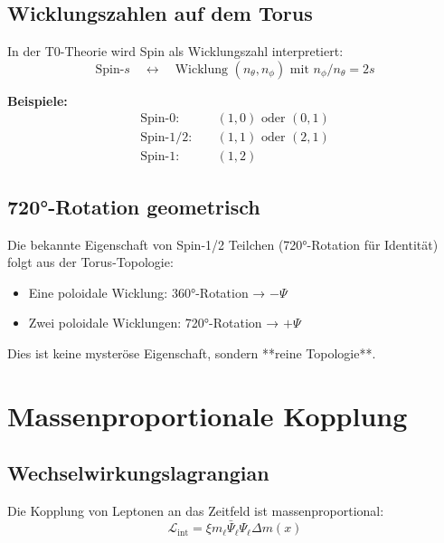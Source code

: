 	\subsection{Wicklungszahlen auf dem Torus}
	
	In der T0-Theorie wird Spin als Wicklungszahl interpretiert:
	\begin{equation}
		\text{Spin-}s \quad \longleftrightarrow \quad 
		\text{Wicklung } (n_\theta, n_\phi) \text{ mit } n_\phi/n_\theta = 2s
		\label{eq:spin_topology}
	\end{equation}
	
	\textbf{Beispiele:}
	\begin{align}
		\text{Spin-}0: &\quad (1, 0) \text{ oder } (0, 1) \\
		\text{Spin-}1/2: &\quad (1, 1) \text{ oder } (2, 1) \\
		\text{Spin-}1: &\quad (1, 2)
	\end{align}
	
	\subsection{720°-Rotation geometrisch}
	
	Die bekannte Eigenschaft von Spin-1/2 Teilchen (720°-Rotation für Identität) 
	folgt aus der Torus-Topologie:
	
	\begin{itemize}
		\item Eine poloidale Wicklung: 360°-Rotation → $-\Psi$
		\item Zwei poloidale Wicklungen: 720°-Rotation → $+\Psi$
	\end{itemize}
	
	Dies ist keine mysteröse Eigenschaft, sondern **reine Topologie**.
	
	\section{Massenproportionale Kopplung}
	
	\subsection{Wechselwirkungslagrangian}
	
	Die Kopplung von Leptonen an das Zeitfeld ist massenproportional:
	\begin{equation}
		\mathcal{L}_{\text{int}} = \xi m_\ell \bar{\Psi}_\ell \Psi_\ell \Delta m(x)
		\label{eq:mass_proportional}
	\end{equation}
	
